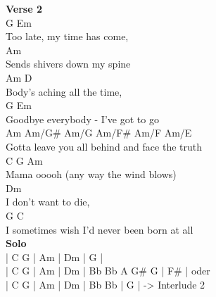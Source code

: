 \documentclass[a4paper]{article}
\begin{document}
{{        }
        \textbf{Verse 2}
        ~\\
        {
            \cutive
            \obeyspaces
G            Em
\\
Too late, my time has come,
\\
      Am
\\
Sends shivers down my spine
\\
       Am               D
\\
Body's aching all the time,
\\
G                        Em
\\
Goodbye everybody - I've got to go
\\
      Am              Am/G\#    Am/G Am/F\#    Am/F Am/E
\\
Gotta leave you all behind and face   the truth
\\
C    G Am
\\
Mama ooooh (any way the wind blows)
\\
Dm
\\
I don't want to die,
\\
  G                                      C
\\
I sometimes wish I'd never been born at all
\\

        }
        \textbf{Solo}
        ~\\
        {
            \cutive
            \obeyspaces
| C G | Am  | Dm  | G   |
\\
| C G | Am  | Dm  | Bb  Bb A G\# G | F\#   |     oder
\\
| C G | Am  | Dm  | Bb  Bb | G   | 	       -> Interlude 2
\\

}}
\end{document}
